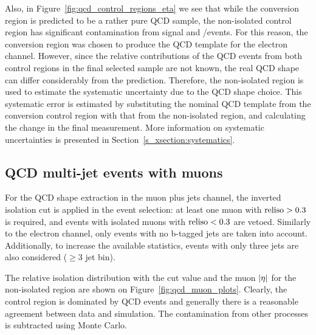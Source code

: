 Also, in Figure~\ref{fig:qcd_control_regions_eta} we see that while the conversion region is predicted to be a rather
pure QCD sample, the non-isolated control region has significant contamination from \ttbar signal and \W/\ZpJets events.
For this reason, the conversion region was chosen to produce the QCD template for the electron channel. However, since
the relative contributions of the QCD events from both control regions in the final selected sample are not known, the
real QCD shape can differ considerably from the prediction. Therefore, the non-isolated region is used to estimate the
systematic uncertainty due to the QCD shape choice. This systematic error is estimated by substituting the nominal QCD
template from the conversion control region with that from the non-isolated region, and calculating the change in the
final measurement. More information on systematic uncertainties is presented in Section~\ref{s_xsection:systematics}.

\subsection{QCD multi-jet events with muons}
For the QCD shape extraction in the muon plus jets channel, the inverted isolation cut is applied in the event
selection: at least one muon with $\textrm{reliso}>0.3$ is required, and events with isolated muons with $\textrm{reliso}<0.3$ are
vetoed. Similarly to the electron channel, only events with no b-tagged jets are taken into account. Additionally, to
increase the available statistics, events with only three jets are also considered ($\geq 3$ jet bin).

The relative isolation distribution with the cut value and the muon $\lvert \eta \rvert$ for the non-isolated region are shown on
Figure~\ref{fig:qcd_muon_plots}. Clearly, the control region is dominated by QCD events and generally there is a
reasonable agreement between data and simulation. The contamination from other processes is subtracted using Monte
Carlo.

